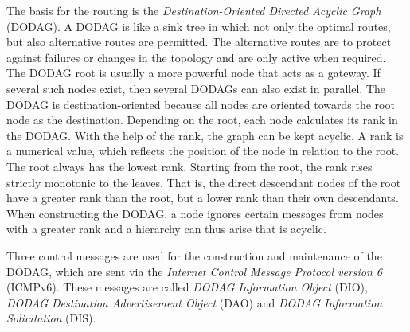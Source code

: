 \documentclass[english,version-2019-11]{uzl-thesis}
\begin{document}
The basis for the routing is the \emph{Destination-Oriented Directed Acyclic Graph} (DODAG).
A DODAG is like a sink tree in which not only the optimal routes,
but also alternative routes are permitted. The alternative
routes are to protect against failures or changes in the topology
and are only active when required. The DODAG root is usually
a more powerful node that acts as a gateway. If several such
nodes exist, then several DODAGs can also exist in parallel.
The DODAG is destination-oriented because all nodes are oriented
towards the root node as the destination. Depending on the root,
each node calculates its rank in the DODAG. With the help
of the rank, the graph can be kept acyclic. A rank is a numerical value,
which reflects the position
of the node in relation to the root. The root always has the lowest rank.
Starting from the root, the rank rises strictly monotonic
to the leaves. That is, the direct descendant nodes of the root
have a greater rank than the root, but a lower rank than their
own descendants. When constructing the DODAG, a node ignores
certain messages from nodes with a greater rank and a
hierarchy can thus arise that is acyclic.

Three control messages are used for the construction and maintenance
of the DODAG, which are sent via the
\emph{Internet Control Message Protocol version 6} (ICMPv6).
These messages are called \emph{DODAG Information Object} (DIO),
\emph{DODAG Destination Advertisement Object} (DAO)
and \emph{DODAG Information Solicitation} (DIS).~\cite{RPLWhitepaper}
\end{document}
